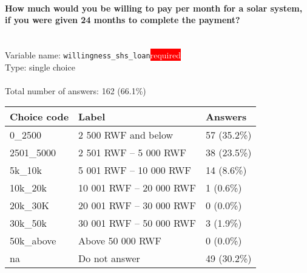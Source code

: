 \documentclass[11.5pt, a4paper]{scrartcl}
\begin{document}
\paragraph{How much would you be willing to pay per month for a solar system, if you were given 24 months to complete the payment?}
\  \\Variable name: \texttt{willingness\_shs\_loan}\hfill\colorbox{red}{\small{\textcolor{white}{required}}}\\
 Type: single choice\\
\\Total number of answers: 162 (66.1\%)
\\[0.2em] \begin{tabular}{p{4cm}|p{8cm}|p{3cm}}
Choice code & Label & Answers \\
\hline
0\_2500 & 2 500 RWF and below& \cellcolor{color1}57 (35.2\%)\\
\cellcolor{mygray} 2501\_5000 & \cellcolor{mygray}2 501 RWF – 5 000 RWF & \cellcolor{color1}38 (23.5\%)\\
5k\_10k & 5 001 RWF – 10 000 RWF& \cellcolor{color0}14 (8.6\%)\\
\cellcolor{mygray} 10k\_20k & \cellcolor{mygray}10 001 RWF – 20 000 RWF & \cellcolor{color0}1 (0.6\%)\\
20k\_30K & 20 001 RWF – 30 000 RWF& \cellcolor{color0}0 (0.0\%)\\
\cellcolor{mygray} 30k\_50k & \cellcolor{mygray}30 001 RWF – 50 000 RWF & \cellcolor{color0}3 (1.9\%)\\
50k\_above & Above 50 000 RWF& \cellcolor{color0}0 (0.0\%)\\
\cellcolor{mygray} na & \cellcolor{mygray}Do not answer & \cellcolor{color1}49 (30.2\%)\\
\end{tabular}
\end{document}
